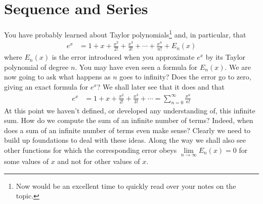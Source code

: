 %
%
\graphicspath{{figures/series/}}
\chapter{Sequence and Series}\label{chap seq ser}

You have probably learned about Taylor polynomials\footnote{Now would be an
excellent time to quickly read over your notes on the topic.} and, in particular, that
\begin{align*}
e^x &= 1 + x  + \frac{x^2}{2!} + \frac{x^3}{3!} + \cdots + \frac{x^n}{n!}
      +E_n(x)
\end{align*}
where $E_n(x)$ is the error introduced when you approximate $e^x$ by
its Taylor polynomial of degree $n$. You may have even seen a formula for $E_n(x)$. We are now going to ask what happens as $n$
goes to infinity? Does the error go to zero, giving an exact formula for $e^x$? We shall later see that it does and
that
\begin{align*}
e^x &=1 + x  + \frac{x^2}{2!} + \frac{x^3}{3!} + \cdots = \sum_{n=0}^\infty\frac{x^n}{n!}
\end{align*}
At this point we haven't defined, or developed any understanding of,
this infinite sum. How do we compute the sum of an infinite number of
terms? Indeed, when does a sum of an infinite
number of terms even make sense? Clearly we need to build up
foundations to deal with these ideas. Along the way we
shall also see other functions for which the corresponding error
obeys $\lim\limits_{n\rightarrow\infty}E_n(x)=0$ for
some values of $x$ and not for other values of $x$.

